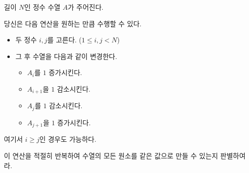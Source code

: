 길이 $N$인 정수 수열 $A$가 주어진다.

당신은 다음 연산을 원하는 만큼 수행할 수 있다.

\begin{itemize}
    \item 두 정수 $i, j$를 고른다. ($1 \le i, j < N$)
    \item 그 후 수열을 다음과 같이 변경한다.
    \begin{itemize}
        \item $A_i$를 $1$ 증가시킨다.
        \item $A_{i+1}$을 $1$ 감소시킨다.
        \item $A_j$를 $1$ 감소시킨다.
        \item $A_{j+1}$을 $1$ 증가시킨다.
    \end{itemize}
\end{itemize}

여기서 $i \ge j$인 경우도 가능하다.

이 연산을 적절히 반복하여 수열의 모든 원소를 같은 값으로 만들 수 있는지 판별하여라.